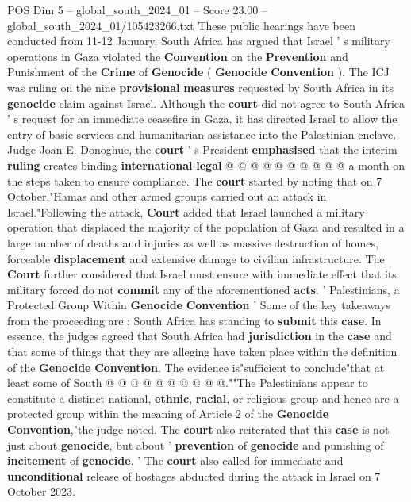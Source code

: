 \begin{textsample}{POS Dim 5 – global\_south\_2024\_01 – Score 23.00 – global\_south\_2024\_01/105423266.txt}
These public hearings have been conducted from 11-12 January.
South Africa has argued that Israel ' s military operations in Gaza violated the \textbf{Convention} on the \textbf{Prevention} and Punishment of the \textbf{Crime} of \textbf{Genocide} ( \textbf{Genocide} \textbf{Convention} ).
The ICJ was ruling on the nine \textbf{provisional} \textbf{measures} requested by South Africa in its \textbf{genocide} claim against Israel.
Although the \textbf{court} did not agree to South Africa ' s request for an immediate ceasefire in Gaza, it has directed Israel to allow the entry of basic services and humanitarian assistance into the Palestinian enclave.
Judge Joan E.
Donoghue, the \textbf{court} ' s President \textbf{emphasised} that the interim \textbf{ruling} creates binding \textbf{international} \textbf{legal} @ @ @ @ @ @ @ @ @ @ a month on the steps taken to ensure compliance.
The \textbf{court} started by noting that on 7 October,"Hamas and other armed groups carried out an attack in Israel."Following the attack, \textbf{Court} added that Israel launched a military operation that displaced the majority of the population of Gaza and resulted in a large number of deaths and injuries as well as massive destruction of homes, forceable \textbf{displacement} and extensive damage to civilian infrastructure.
The \textbf{Court} further considered that Israel must ensure with immediate effect that its military forced do not \textbf{commit} any of the aforementioned \textbf{acts}. ' Palestinians, a Protected Group Within \textbf{Genocide} \textbf{Convention} ' Some of the key takeaways from the proceeding are : South Africa has standing to \textbf{submit} this \textbf{case}.
In essence, the judges agreed that South Africa had \textbf{jurisdiction} in the \textbf{case} and that some of things that they are alleging have taken place within the definition of the \textbf{Genocide} \textbf{Convention}.
The evidence is"sufficient to conclude"that at least some of South @ @ @ @ @ @ @ @ @ @.""The Palestinians appear to constitute a distinct national, \textbf{ethnic}, \textbf{racial}, or religious group and hence are a protected group within the meaning of Article 2 of the \textbf{Genocide} \textbf{Convention},"the judge noted.
The \textbf{court} also reiterated that this \textbf{case} is not just about \textbf{genocide}, but about ' \textbf{prevention} of \textbf{genocide} and punishing of \textbf{incitement} of \textbf{genocide}. ' The \textbf{court} also called for immediate and \textbf{unconditional} release of hostages abducted during the attack in Israel on 7 October 2023.

\end{textsample}
